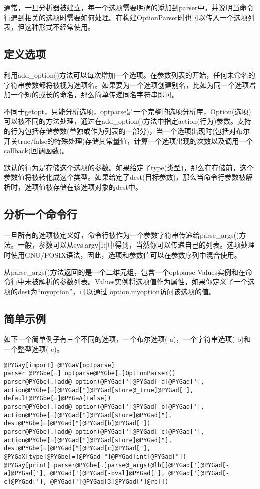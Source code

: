 \documentclass[a4paper,10pt,english]{manual}
\begin{document}
通常，一旦分析器被建立，每一个选项需要明确的添加到parser中，并说明当命令行遇到相关的选项时需要如何处理。在构建OptionParser时也可以传入一个选项列表，但这种形式不经常使用。


\subsection{定义选项}

利用add\_option()方法可以每次增加一个选项。在参数列表的开始，任何未命名的字符串参数都将被视为选项名。如果要为一个选项创建别名，比如为同一个选项增加一个短的或长的命名，那么简单传递同名字符串即可。

不同于getopt，只能分析选项，optparse是一个完整的选项分析库，Option(选项)可以被不同的方法处理，通过在add\_option()方法中指定action(行为)参数。支持的行为包括存储参数(单独或作为列表的一部分)，当一个选项出现时(包括对布尔开关true/false的特殊处理)存储其常量值，计算一个选项出现的次数以及调用一个callback(回调函数)。

默认的行为是存储这个选项的参数。如果给定了type(类型)，那么在存储前，这个参数值将被转化成这个类型。如果给定了dest(目标参数)，那么当命令行参数被解析时，选项值被存储在该选项对象的dest中。


\subsection{分析一个命令行}

一旦所有的选项被定义好，命令行被作为一个参数字符串传递给parse\_args()方法。一般，参数可以从sys.argv{[}1:{]}中得到，当然你可以传递自己的列表。选项处理时使用GNU/POSIX语法，因此，选项和参数值可以在参数序列中混合使用。

从parse\_args()方法返回的是一个二维元组，包含一个optparse Values实例和在命令行中未被解析的参数列表。Values实例将选项值作为属性，如果你定义了一个选项的dest为“myoption”，可以通过 option.myoption访问该选项的值。


\subsection{简单示例}

如下一个简单例子有三个不同的选项，一个布尔选项(-a)，一个字符串选项(-b)和一个整型选项(-c)。

\begin{Verbatim}[commandchars=@\[\]]
@PYGay[import] @PYGaV[optparse]
parser @PYGbe[=] optparse@PYGbe[.]OptionParser()
parser@PYGbe[.]add@_option(@PYGad[']@PYGad[-a]@PYGad['], action@PYGbe[=]@PYGad["]@PYGad[store@_true]@PYGad["], default@PYGbe[=]@PYGaA[False])
parser@PYGbe[.]add@_option(@PYGad[']@PYGad[-b]@PYGad['], action@PYGbe[=]@PYGad["]@PYGad[store]@PYGad["], dest@PYGbe[=]@PYGad["]@PYGad[b]@PYGad["])
parser@PYGbe[.]add@_option(@PYGad[']@PYGad[-c]@PYGad['], action@PYGbe[=]@PYGad["]@PYGad[store]@PYGad["], dest@PYGbe[=]@PYGad["]@PYGad[c]@PYGad["], @PYGaX[type]@PYGbe[=]@PYGad["]@PYGad[int]@PYGad["])
@PYGay[print] parser@PYGbe[.]parse@_args(@lb[]@PYGad[']@PYGad[-a]@PYGad['], @PYGad[']@PYGad[-bval]@PYGad['], @PYGad[']@PYGad[-c]@PYGad['], @PYGad[']@PYGad[3]@PYGad[']@rb[])
\end{Verbatim}
\end{document}
